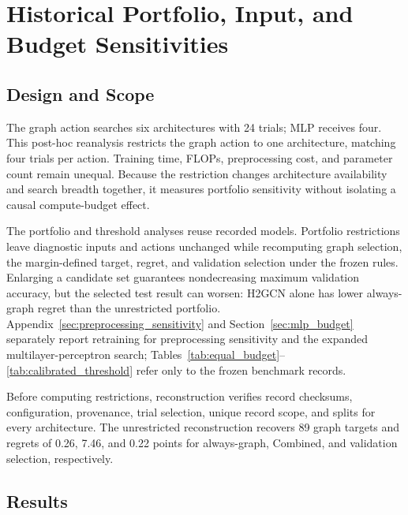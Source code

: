 \section{Historical Portfolio, Input, and Budget Sensitivities}
\label{sec:equal_budget}

\subsection{Design and Scope}

The graph action searches six architectures with 24 trials; MLP receives four. This post-hoc reanalysis restricts the graph action to one architecture, matching four trials per action. Training time, FLOPs, preprocessing cost, and parameter count remain unequal. Because the restriction changes architecture availability and search breadth together, it measures portfolio sensitivity without isolating a causal compute-budget effect.

The portfolio and threshold analyses reuse recorded models. Portfolio restrictions leave diagnostic inputs and actions unchanged while recomputing graph selection, the margin-defined target, regret, and validation selection under the frozen rules. Enlarging a candidate set guarantees nondecreasing maximum validation accuracy, but the selected test result can worsen: H2GCN alone has lower always-graph regret than the unrestricted portfolio. Appendix~\ref{sec:preprocessing_sensitivity} and Section~\ref{sec:mlp_budget} separately report retraining for preprocessing sensitivity and the expanded multilayer-perceptron search; Tables~\ref{tab:equal_budget}--\ref{tab:calibrated_threshold} refer only to the frozen benchmark records.

Before computing restrictions, reconstruction verifies record checksums, configuration, provenance, trial selection, unique record scope, and splits for every architecture. The unrestricted reconstruction recovers 89 graph targets and regrets of 0.26, 7.46, and 0.22 points for always-graph, Combined, and validation selection, respectively.

\subsection{Results}


